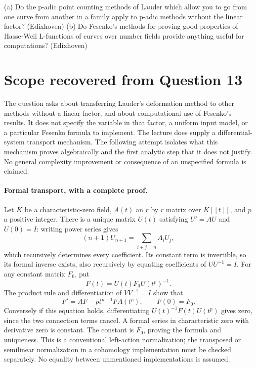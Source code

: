 \documentclass[11pt]{article}
\begin{document}
(a) Do the p-adic point counting methods of Lauder which allow you to go from one curve from another in a family apply to p-adic methods without the linear factor? (Edixhoven) (b) Do Fesenko's methods for proving good properties of Hasse-Weil L-functions of curves over number fields provide anything useful for computations? (Edixhoven)

\section{Scope recovered from Question 13}
The question asks about transferring Lauder's deformation method to
other methods without a linear factor, and about computational use of
Fesenko's results. It does not specify the variable in that factor, a
uniform input model, or a particular Fesenko formula to implement.
The lecture does supply a differential-system transport mechanism.
The following attempt isolates what this mechanism proves algebraically
and the first analytic step that it does not justify. No general
complexity improvement or consequence of an unspecified formula is claimed.

\paragraph{Formal transport, with a complete proof.}
Let $K$ be a characteristic-zero field, $A(t)$ an $r$ by $r$ matrix
over $K[[t]]$, and $p$ a positive integer. There is a unique matrix
$U(t)$ satisfying $U'=AU$ and $U(0)=I$: writing power series gives
\[
(n+1)U_{n+1}=\sum_{i+j=n}A_iU_j,
\]
which recursively determines every coefficient. Its constant term is
invertible, so its formal inverse exists, also recursively by equating
coefficients of $UU^{-1}=I$. For any constant matrix $F_0$, put
\[
F(t)=U(t)F_0U(t^p)^{-1}.
\]
The product rule and differentiation of $VV^{-1}=I$ show that
\[
F'=AF-p t^{p-1}F A(t^p),\qquad F(0)=F_0.
\]
Conversely if this equation holds, differentiating
$U(t)^{-1}F(t)U(t^p)$ gives zero, since the two connection terms
cancel. A formal series in characteristic zero with derivative zero
is constant. The constant is $F_0$, proving the formula and uniqueness.
This is a conventional left-action normalization; the transposed or
semilinear normalization in a cohomology implementation must be checked
separately. No equality between unmentioned implementations is assumed.
\end{document}
